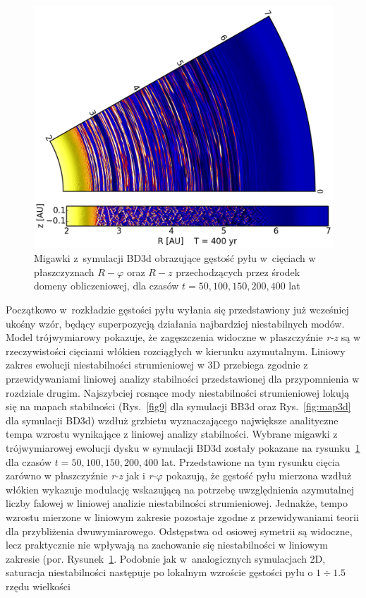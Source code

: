 \begin{figure}
   \includegraphics[width=0.44\linewidth]{figures/slice_nosg_05}
   \caption{
      Migawki z~symulacji BD3d obrazujące gęstość pyłu w~cięciach w
      płaszczyznach $R -\varphi$ oraz $R - z$ przechodzących przez środek 
   domeny obliczeniowej, dla czasów $t= 50, 100, 150, 200, 400$ lat}
   \label{fig:slicenosg}
\end{figure}
%
Początkowo w~rozkładzie gęstości pyłu wyłania się przedstawiony już wcześniej
ukośny wzór, będący superpozycją działania najbardziej niestabilnych modów.
Model trójwymiarowy pokazuje, że zagęszczenia widoczne w płaszczyźnie
\textit{r-z} są w rzeczywistości cięciami włókien rozciągłych w kierunku
azymutalnym. Liniowy zakres ewolucji niestabilności strumieniowej w 3D przebiega
zgodnie z przewidywaniami liniowej analizy stabilności przedstawionej dla
przypomnienia w rozdziale drugim. Najszybciej rosnące mody niestabilności
strumieniowej lokują się na mapach stabilności (Rys.~\ref{fig9} dla symulacji
BB3d oraz Rys.~\ref{fig:map3d} dla symulacji BD3d) wzdłuż grzbietu
wyznaczającego największe analityczne tempa wzrostu wynikające z liniowej
analizy stabilności. Wybrane migawki z trójwymiarowej
ewolucji dysku w symulacji BD3d zostały pokazane na rysunku~\ref{fig:slicenosg}
dla czasów $t =  50, 100, 150, 200, 400$ lat. Przedstawione na tym rysunku
cięcia zarówno w płaszczyźnie \textit{r-z} jak i \textit{r-}$\varphi$ pokazują, że
gęstość pyłu mierzona wzdłuż włókien wykazuje modulację wskazującą na
potrzebę uwzględnienia azymutalnej liczby falowej w liniowej analizie
niestabilności strumieniowej. Jednakże, tempo wzrostu mierzone w liniowym
zakresie pozostaje zgodne z przewidywaniami teorii dla przybliżenia
dwuwymiarowego. Odstępstwa od osiowej symetrii są widoczne, lecz praktycznie nie
wpływają na zachowanie się niestabilności w liniowym zakresie (por.
Rysunek~\ref{fig:slicenosg}. Podobnie jak w~analogicznych symulacjach 2D,
saturacja niestabilności następuje po lokalnym wzroście gęstości pyłu o
$1\div1.5$ rzędu wielkości
%
